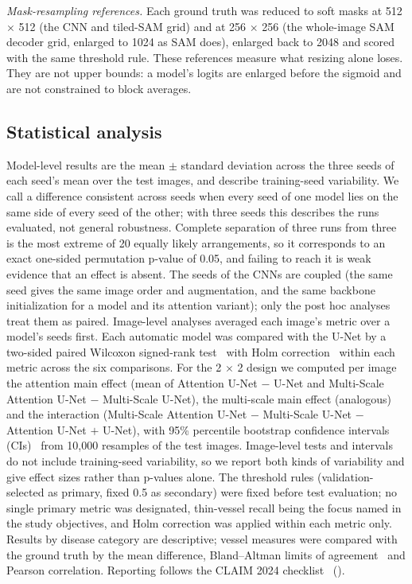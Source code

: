 \emph{Mask-resampling references.} Each ground truth was reduced to soft masks at 512 $\times$ 512 (the CNN and tiled-SAM
grid) and at 256 $\times$ 256 (the whole-image SAM decoder grid, enlarged to 1024 as SAM does), enlarged back to 2048 and
scored with the same threshold rule. These references measure what resizing alone loses. They are not upper bounds: a
model's logits are enlarged before the sigmoid and are not constrained to block averages.

\subsection*{Statistical analysis}
Model-level results are the mean $\pm$ standard deviation across the three seeds of each seed's mean over the
\NTestImages{} test images, and describe training-seed variability. We call a difference consistent across seeds when every
seed of one model lies on the same side of every seed of the other; with three seeds this describes the runs evaluated, not
general robustness. Complete separation of three runs from three is the most extreme of 20 equally likely arrangements, so it corresponds to
an exact one-sided permutation p-value of 0.05, and failing to reach it is weak evidence that an effect is absent. The seeds
of the CNNs are coupled (the same seed gives the same image order and augmentation, and the same backbone initialization
for a model and its attention variant); only the post hoc analyses treat them as paired. Image-level analyses averaged each image's
metric over a model's seeds first. Each automatic model was compared with the U-Net by a two-sided paired Wilcoxon signed-rank test~\cite{wilcoxon1945,virtanen2020scipy} with Holm
correction~\cite{holm1979} within each metric across the six comparisons. For the 2 $\times$ 2 design we computed per image
the attention main effect (mean of Attention U-Net $-$ U-Net and Multi-Scale Attention U-Net $-$ Multi-Scale U-Net), the
multi-scale main effect (analogous) and the interaction (Multi-Scale Attention U-Net $-$ Multi-Scale U-Net $-$ Attention
U-Net $+$ U-Net), with 95\% percentile bootstrap confidence intervals (CIs)~\cite{efron1979bootstrap} from 10,000 resamples of
the test images. Image-level tests and intervals do not include training-seed variability, so we report both kinds of
variability and give effect sizes rather than p-values alone. The threshold rules (validation-selected as primary, fixed 0.5 as secondary) were fixed before test evaluation; no single
primary metric was designated, thin-vessel recall being the focus named in the study objectives, and Holm correction was
applied within each metric only. Results by disease category are descriptive; vessel measures
were compared with the ground truth by the mean difference, Bland--Altman limits of agreement~\cite{bland1986} and Pearson
correlation. Reporting follows the CLAIM 2024 checklist~\cite{tejani2024claim,mongan2020claim} ().

